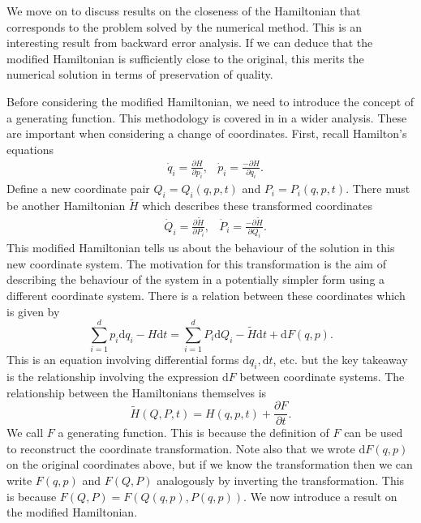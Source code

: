We move on to discuss results on the closeness of the Hamiltonian that corresponds to the problem solved by the numerical method.
This is an interesting result from backward error analysis.
If we can deduce that the modified Hamiltonian is sufficiently close to the original,
this merits the numerical solution in terms of preservation of quality.

Before considering the modified Hamiltonian, we need to introduce the concept of a generating function.
This methodology is covered in \cite{Casas_2016} in a wider analysis.
These are important when considering a change of coordinates.
First, recall Hamilton's equations
\begin{align*}
	&\dot{q}_i = \frac{\partial H}{\partial p_i}, &\dot{p}_i = \frac{- \partial H}{\partial q_i}.
\end{align*}
Define a new coordinate pair $Q_i = Q_i(q,p,t)$ and $P_i = P_i(q,p,t)$.
There must be another Hamiltonian $\tilde{H}$ which describes these transformed coordinates
\begin{align*}
	&\dot{Q}_i = \frac{\partial \tilde{H}}{\partial P_i}, &\dot{P}_i = \frac{- \partial \tilde{H}}{\partial Q_i}.
\end{align*}
This modified Hamiltonian tells us about the behaviour of the solution in this new coordinate system.
The motivation for this transformation is the aim of describing the behaviour of the system in a potentially simpler form using a different coordinate system. %
There is a relation between these coordinates which is given by
\begin{equation}
	\sum_{i=1}^{d} p_i \mathrm{d}q_i - H \mathrm{d}t = \sum_{i=1}^{d} P_i \mathrm{d}Q_i - \tilde{H} \mathrm{d}t + \mathrm{d}F(q,p).
	\label{eqn:genfunc}
\end{equation}
This is an equation involving differential forms $\mathrm{d}q_i, \mathrm{d}t$, etc. but the key takeaway is the relationship involving the expression $\mathrm{d}F$ between coordinate systems.
The relationship between the Hamiltonians themselves is
\begin{equation*}
	\tilde{H}(Q,P,t) = H(q,p,t) + \frac{\partial F}{\partial t}.
\end{equation*}
We call $F$ a generating function. This is because the definition of $F$ can be used to reconstruct the coordinate transformation.
Note also that we wrote $\mathrm{d}F(q,p)$ on the original coordinates above, but if we know the transformation then we can write $F(q,p)$ and $F(Q,P)$ analogously by inverting the transformation.
This is because $F(Q,P) = F(Q(q,p),P(q,p))$.
We now introduce a result on the modified Hamiltonian.


